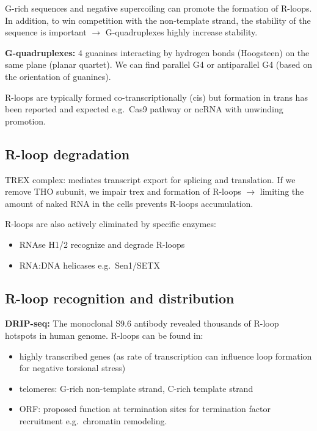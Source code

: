 G-rich sequences and negative supercoiling can promote the formation of R-loops. In addition, to win competition with the non-template strand, the stability of the sequence is important $\rightarrow$ G-quadruplexes highly increase stability.

\textbf{G-quadruplexes:} 4 guanines interacting by hydrogen bonds (Hoogsteen) on the same plane (planar quartet). We can find parallel G4 or antiparallel G4 (based on the orientation of guanines).

R-loops are typically formed co-transcriptionally (cis) but formation in trans has been reported and expected e.g.~Cas9 pathway or ncRNA with unwinding promotion.

\hypertarget{r-loop-degradation}{%
\subsection{R-loop degradation}\label{r-loop-degradation}}

TREX complex: mediates transcript export for splicing and translation. If we remove THO subunit, we impair trex and formation of R-loops $\rightarrow$ limiting the amount of naked RNA in the cells prevents R-loops accumulation.

R-loops are also actively eliminated by specific enzymes:
\begin{itemize}
\tightlist
\item
  RNAse H1/2 recognize and degrade R-loops
\item
  RNA:DNA helicases e.g.~Sen1/SETX
\end{itemize}

\hypertarget{r-loop-recognition-and-distribution}{%
\subsection{R-loop recognition and distribution}\label{r-loop-recognition-and-distribution}}

\textbf{DRIP-seq:} The monoclonal S9.6 antibody revealed thousands of R-loop hotspots in human genome. R-loops can be found in:
\begin{itemize}
\tightlist
\item
  highly transcribed genes (as rate of transcription can influence loop formation for negative torsional stress)
\item
  telomeres: G-rich non-template strand, C-rich template strand
\item
  ORF: proposed function at termination sites for termination factor recruitment e.g.~chromatin remodeling.
\end{itemize}

